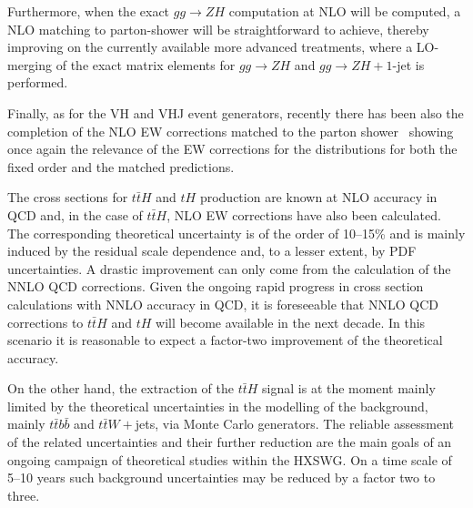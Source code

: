 Furthermore, when the exact $gg\rightarrow ZH$ computation at NLO will be computed, a
NLO matching to parton-shower will be straightforward to achieve,
thereby improving on the currently available more advanced treatments,
where a LO-merging of the exact matrix elements for $gg\rightarrow ZH$ and
$gg\rightarrow ZH+1$-jet is performed.

Finally, as for the VH and VHJ event generators, recently there has been
also the completion of the NLO EW corrections matched to the parton
shower~\cite{Granata:2017iod} showing once again the relevance of the
EW corrections for the distributions for both the fixed order and the
matched predictions.


\label{sec:hl-lhc-ttH}
The cross sections for $t\bar t H$ and $tH$ production are known at NLO accuracy in QCD and, in the
case of $t \bar t H$, NLO EW corrections have also been calculated. The corresponding
theoretical uncertainty is of the order of 10--15\% and is mainly induced by the
residual scale dependence and, to a lesser extent, by PDF uncertainties. A
drastic improvement can only come from the calculation of the NNLO QCD
corrections. Given the ongoing rapid progress in cross section calculations with NNLO accuracy in QCD, it is
foreseeable that NNLO QCD corrections to $t\bar t H$ and $tH$ will become available in the
next decade. In this scenario it is reasonable to expect a factor-two
improvement of the theoretical accuracy.

On the other hand, the extraction of the $t \bar t H$ signal is at the moment mainly
limited by the theoretical uncertainties in the modelling of the background,
mainly $t\bar t b \bar b$ and $t \bar t W+$jets, via Monte Carlo generators. The reliable assessment of
the related uncertainties and their further reduction are the main goals of an
ongoing campaign of theoretical studies within the HXSWG. On a time scale of
5--10 years such background uncertainties may be reduced by a factor two to
three.



